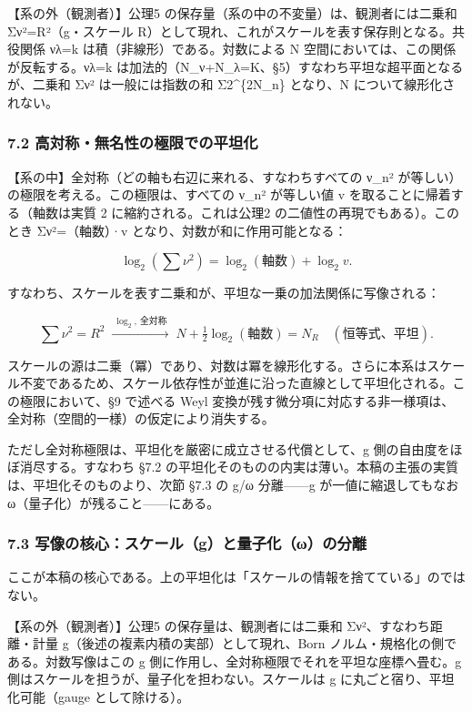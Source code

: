 \documentclass[11pt]{ltjsarticle}
\begin{document}
【系の外（観測者）】公理5 の保存量（系の中の不変量）は、観測者には二乗和
Σν²=R²（g・スケール
R）として現れ、これがスケールを表す保存則となる。共役関係 νλ=k
は積（非線形）である。対数による N
空間においては、この関係が反転する。νλ=k
は加法的（N\_ν+N\_λ=K、§5）すなわち平坦な超平面となるが、二乗和 Σν²
は一般には指数の和 Σ2\^{}\{2N\_n\} となり、N について線形化されない。

\subsubsection{7.2
高対称・無名性の極限での平坦化}\label{ux9ad8ux5bfeux79f0ux7121ux540dux6027ux306eux6975ux9650ux3067ux306eux5e73ux5766ux5316}

【系の中】全対称（どの軸も右辺に来れる、すなわちすべての ν\_n²
が等しい）の極限を考える。この極限は、すべての ν\_n² が等しい値 v
を取ることに帰着する（軸数は実質 2 に縮約される。これは公理2
の二値性の再現でもある）。このとき Σν²=（軸数）·v
となり、対数が和に作用可能となる：

\[\log_2\!\left(\sum\nu^2\right) = \log_2(\text{軸数}) + \log_2 v.\]

すなわち、スケールを表す二乗和が、平坦な一乗の加法関係に写像される：

\[\sum\nu^2 = R^2 \;\xrightarrow{\ \log_2,\ \text{全対称}\ }\; N + \tfrac12\log_2(\text{軸数}) = N_R \quad(\text{恒等式、平坦}).\]

スケールの源は二乗（冪）であり、対数は冪を線形化する。さらに本系はスケール不変であるため、スケール依存性が並進に沿った直線として平坦化される。この極限において、§9
で述べる Weyl
変換が残す微分項に対応する非一様項は、全対称（空間的一様）の仮定により消失する。

ただし全対称極限は、平坦化を厳密に成立させる代償として、g
側の自由度をほぼ消尽する。すなわち §7.2
の平坦化そのものの内実は薄い。本稿の主張の実質は、平坦化そのものより、次節
§7.3 の g/ω 分離------g が一値に縮退してもなお
ω（量子化）が残ること------にある。

\subsubsection{7.3
写像の核心：スケール（g）と量子化（ω）の分離}\label{ux5199ux50cfux306eux6838ux5fc3ux30b9ux30b1ux30fcux30ebgux3068ux91cfux5b50ux5316ux3c9ux306eux5206ux96e2}

ここが本稿の核心である。上の平坦化は「スケールの情報を捨てている」のではない。

【系の外（観測者）】公理5 の保存量は、観測者には二乗和
Σν²、すなわち距離・計量 g（後述の複素内積の実部）として現れ、Born
ノルム・規格化の側である。対数写像はこの g
側に作用し、全対称極限でそれを平坦な座標へ畳む。g
側はスケールを担うが、量子化を担わない。スケールは g
に丸ごと宿り、平坦化可能（gauge として除ける）。
\end{document}
